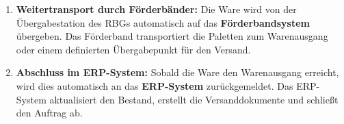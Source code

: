 \begin{enumerate}
	\item \textbf{Weitertransport durch Förderbänder:}  
	Die Ware wird von der Übergabestation des RBGs automatisch auf das \textbf{Förderbandsystem} übergeben. Das Förderband transportiert die Paletten zum Warenausgang oder einem definierten Übergabepunkt für den Versand.
	
	\item \textbf{Abschluss im ERP-System:}  
	Sobald die Ware den Warenausgang erreicht, wird dies automatisch an das \textbf{ERP-System} zurückgemeldet. Das ERP-System aktualisiert den Bestand, erstellt die Versanddokumente und schließt den Auftrag ab.
	
\end{enumerate}